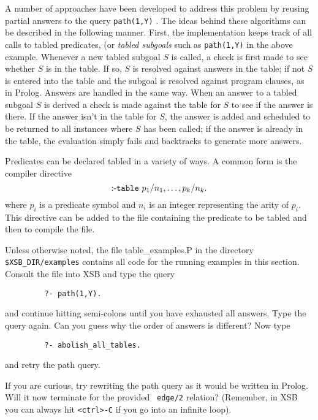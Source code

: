 A number of approaches have been developed to address this problem by
reusing partial answers to the query {\tt path(1,Y)}
\cite{Diet87,TaSa86,BMSU86,Viei89,Walk93}. The ideas behind these
algorithms can be described in the following manner.  First, the
implementation keeps track of all calls to tabled predicates, (or {\em
tabled subgoals} such as {\tt path(1,Y)} in the above example.
Whenever a new tabled subgoal $S$ is called, a check is first made to
see whether $S$ is in the table.  If so, $S$ is resolved against
answers in the table; if not $S$ is entered into the table and the
subgoal is resolved against program clauses, as in Prolog.  Answers
are handled in the same way.  When an answer to a tabled subgoal $S$
is derived a check is made against the table for $S$ to see if the
answer is there.  If the answer isn't in the table for $S$, the answer
is added and scheduled to be returned to all instances where $S$ has
been called; if the answer is already in the table, the evaluation
simply fails and backtracks to generate more answers.

Predicates can be declared tabled in a variety of ways.  A common form
is the compiler directive
\[
	{\tt \mbox{:-} table\ } p_1/n_1, \ldots, p_k/n_k.
\]
where $p_i$ is a predicate symbol and $n_i$ is an integer representing
the arity of $p_i$.  This directive can be added to the file
containing the predicate to be tabled and then to compile the file.

\begin{exercise}
Unless otherwise noted, the file table\_examples.P in the directory
\verb|$XSB_DIR/examples| contains all code for the running examples in
this section.  Consult the file into XSB and type the query
\begin{verbatim}
         ?- path(1,Y).
\end{verbatim}
and continue hitting semi-colons until you have exhausted all answers.
Type the query again.  Can you guess why the order of answers is
different?  Now type
\begin{verbatim}
         ?- abolish_all_tables.
\end{verbatim}
and retry the path query.
\end{exercise}

\begin{exercise}
If you are curious, try rewriting the path query as it would be
written in Prolog.  Will it now terminate for the provided {\tt
edge/2} relation?  (Remember, in XSB you can always hit
\verb|<ctrl>-C| if you go into an infinite loop).
\end{exercise}

